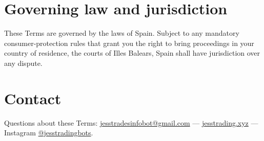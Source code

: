 \documentclass[11pt,a4paper]{article}
\begin{document}
\section{Governing law and jurisdiction}
These Terms are governed by the laws of Spain. Subject to any mandatory consumer-protection rules
that grant you the right to bring proceedings in your country of residence, the courts of
Illes Balears, Spain shall have jurisdiction over any dispute.

\section{Contact}
Questions about these Terms: \href{mailto:jesstradesinfobot@gmail.com}{jesstradesinfobot@gmail.com}
--- \href{https://jesstrading.xyz}{jesstrading.xyz} --- Instagram
\href{https://www.instagram.com/jesstradingbots/}{@jesstradingbots}.
\end{document}
